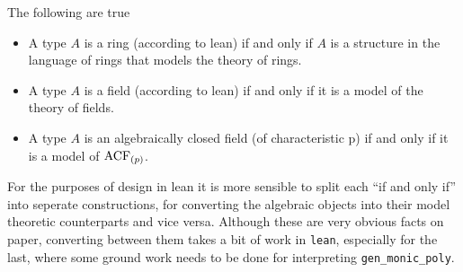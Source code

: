 \begin{prop}
  The following are true
  \begin{itemize}
    \item A type $A$ is a ring (according to lean) if and only if
          $A$ is a structure in the language of rings
          that models the theory of rings.
    \item A type $A$ is a field (according to lean) if and only if
          it is a model of the theory of fields.
    \item A type $A$ is an algebraically closed field (of characteristic p)
          if and only if it is a model of $\operatorname{ACF}_{(p)}$.
  \end{itemize}
  For the purposes of design in lean it is
  more sensible to split each ``if and only if'' into seperate constructions,
  for converting the algebraic objects into their model theoretic counterparts
  and vice versa.
  Although these are very obvious facts on paper,
  converting between them takes a bit of work in \texttt{lean},
  especially for the last,
  where some ground work needs to be done for interpreting \texttt{gen\_monic\_poly}.
\end{prop}



